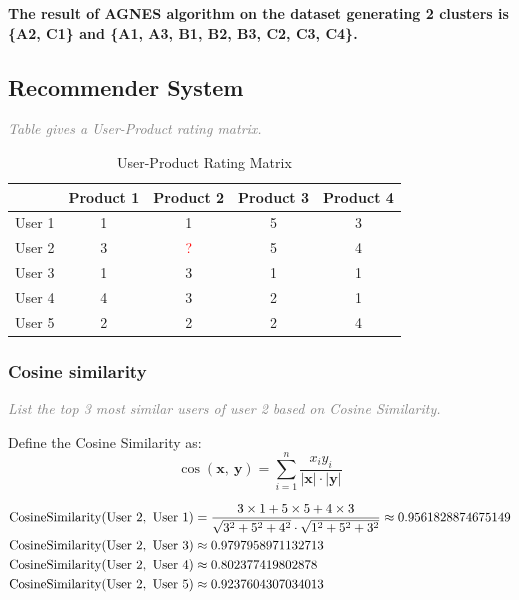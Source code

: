 \documentclass{article}
\begin{document}
\textbf{The result of AGNES algorithm on the dataset generating 2 clusters is \{A2, C1\} and \{A1, A3, B1, B2, B3, C2, C3, C4\}.}





\subsection{Recommender System}
\textcolor{gray}{\it Table gives a User-Product rating matrix.}
\begin{table}[H]
    \centering
    \renewcommand{\arraystretch}{1.2}
    \setlength{\tabcolsep}{24pt}
    \color{gray}
    \caption{User-Product Rating Matrix}
    \begin{tabular}{ccccc}
        \bottomrule[1.5pt]
        \@ & Product 1 & Product 2 & Product 3 & Product 4 \\
        \midrule[0.75pt]
        User 1 & 1 & 1 & 5 & 3 \\
        User 2 & 3 & \textcolor{red}{?} & 5 & 4 \\
        User 3 & 1 & 3 & 1 & 1 \\
        User 4 & 4 & 3 & 2 & 1 \\
        User 5 & 2 & 2 & 2 & 4 \\
        \toprule[1.5pt]
    \end{tabular}
\end{table}



\subsubsection{Cosine similarity}
\textcolor{gray}{\it List the top 3 most similar users of user 2 based on Cosine Similarity.}

Define the Cosine Similarity as:
\[ \cos(\bm{x},\ \bm{y})=\sum_{i=1}^n\dfrac{x_iy_i}{|\bm{x}|\cdot|\bm{y}|} \]

\begin{align*}
    {\rm CosineSimilarity(User\ 2,\ User\ 1)}&=\dfrac{3\times1+5\times5+4\times3}{\sqrt{3^2+5^2+4^2}\cdot\sqrt{1^2+5^2+3^2}}\approx0.9561828874675149
    \\
    {\rm CosineSimilarity(User\ 2,\ User\ 3)}&\approx0.9797958971132713
    \\
    {\rm CosineSimilarity(User\ 2,\ User\ 4)}&\approx0.802377419802878
    \\
    {\rm CosineSimilarity(User\ 2,\ User\ 5)}&\approx0.9237604307034013
\end{align*}
\end{document}
